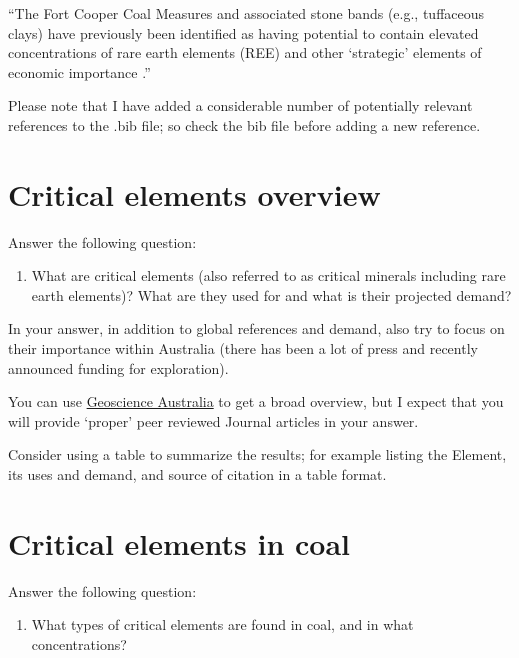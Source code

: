 \documentclass[preprint, 3p,
authoryear]{elsarticle} %
\providecommand{\tightlist}{%
  \setlength{\itemsep}{0pt}\setlength{\parskip}{0pt}}
\begin{document}
``The Fort Cooper Coal Measures and associated stone bands (e.g.,
tuffaceous clays) have previously been identified as having potential to
contain elevated concentrations of rare earth elements (REE) and other
`strategic' elements of economic importance
\citep{Hodgkinson2020, Hodgkinson2021}.''

Please note that I have added a considerable number of potentially
relevant references to the .bib file; so check the bib file before
adding a new reference.

\hypertarget{critical-elements-overview}{%
\section{Critical elements overview}\label{critical-elements-overview}}

Answer the following question:

\begin{enumerate}
\def\labelenumi{\arabic{enumi}.}
\tightlist
\item
  What are critical elements (also referred to as critical minerals
  including rare earth elements)? What are they used for and what is
  their projected demand?
\end{enumerate}

In your answer, in addition to global references and demand, also try to
focus on their importance within Australia (there has been a lot of
press and recently announced funding for exploration).

You can use
\href{https://www.ga.gov.au/scientific-topics/minerals/critical-minerals}{Geoscience
Australia} to get a broad overview, but I expect that you will provide
`proper' peer reviewed Journal articles in your answer.

Consider using a table to summarize the results; for example listing the
Element, its uses and demand, and source of citation in a table format.

\hypertarget{critical-elements-in-coal}{%
\section{Critical elements in coal}\label{critical-elements-in-coal}}

Answer the following question:

\begin{enumerate}
\def\labelenumi{\arabic{enumi}.}
\setcounter{enumi}{1}
\tightlist
\item
  What types of critical elements are found in coal, and in what
  concentrations?
\end{enumerate}
\end{document}
